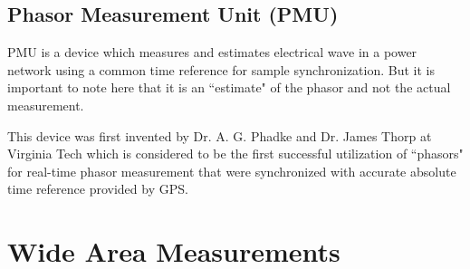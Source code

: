 \subsection{Phasor Measurement Unit (PMU)}
PMU is a device which measures and estimates electrical wave in a power network using a common time reference for sample synchronization. But it is important to note here that it is an ``estimate" of the phasor and not the actual measurement. 

This device was first invented by Dr. A. G. Phadke and Dr. James Thorp at Virginia Tech which is considered to be the first successful utilization of ``phasors" for real-time phasor measurement that were synchronized with accurate absolute time reference provided by GPS.

\section{Wide Area Measurements}

